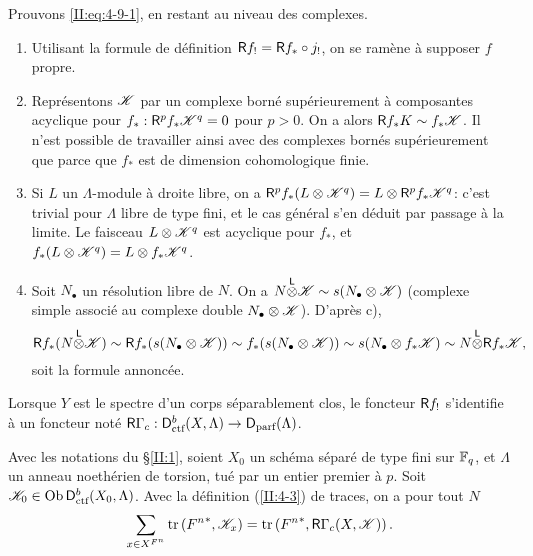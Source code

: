 Prouvons \eqref{II:eq:4-9-1}, en restant au niveau des complexes. 
\begin{enumerate}[\indent a)]
  \item Utilisant la formule de d\'efinition $\mathsf{R} f_! = \mathsf{R} f_*\circ j_!$, on se 
    ram\`ene \`a supposer $f$ propre. 
  \item Repr\'esentons $\mathscr{K}$ par un complexe born\'e 
    sup\'erieurement \`a composantes acyclique pour $f_*:\mathsf{R}^p f_* \mathscr{K}^q = 0$ 
    pour $p>0$. On a alors $\mathsf{R} f_* K \sim f_* \mathscr{K}$. Il n'est possible de 
    travailler ainsi avec des complexes born\'es sup\'erieurement que parce que 
    $f_*$ est de dimension cohomologique finie. 
  \item Si $L$ un $\Lambda$-module \`a droite libre, on a 
    $\mathsf{R}^p f_*(L\otimes \mathscr{K}^q) = L\otimes \mathsf{R}^p f_* \mathscr{K}^q$: c'est trivial pour 
    $\Lambda$ libre de type fini, et le cas g\'en\'eral s'en d\'eduit par 
    passage \`a la limite. Le faisceau $L\otimes \mathscr{K}^q$ est acyclique pour 
    $f_*$, et $f_*(L\otimes \mathscr{K}^q) = L\otimes f_* \mathscr{K}^q$. 
  \item Soit $N_\bullet$ un r\'esolution libre de $N$. On a 
    $N{\overset{\mathsf{L}}{\otimes}} \mathscr{K}\sim s(N_\bullet\otimes \mathscr{K})$ (complexe simple associ\'e au 
    complexe double $N_\bullet\otimes \mathscr{K}$). D'apr\`es c), 
    \[
      \mathsf{R} f_*(N{\overset{\mathsf{L}}{\otimes}} \mathscr{K}) \sim \mathsf{R} f_* (s(N_\bullet\otimes \mathscr{K})) \sim f_*(s(N_\bullet\otimes \mathscr{K})) \sim s(N_\bullet\otimes f_* \mathscr{K}) \sim N{\overset{\mathsf{L}}{\otimes}} \mathsf{R} f_* \mathscr{K} \text{,}
    \]
    soit la formule annonc\'ee. 
\end{enumerate}

Lorsque $Y$ est le spectre d'un corps s\'eparablement clos, le foncteur $\mathsf{R} f_!$ 
s'identifie \`a un foncteur not\'e 
$\mathsf{R} \Gamma_c : \mathsf{D}_\text{ctf}^b(X,\Lambda)\to\mathsf{D}_\text{parf}(\Lambda)$. 





\begin{theorem_}\label{II:4-10}
Avec les notations du \S\ref{II:1}, soient $X_0$ un sch\'ema s\'epar\'e de type 
fini sur $\mathbb{F}_q$, et $\Lambda$ un anneau noeth\'erien de torsion, tu\'e par un 
entier premier \`a $p$. Soit $\mathscr{K}_0\in\operatorname{Ob}\mathsf{D}_\textnormal{ctf}^b(X_0,\Lambda)$. 
Avec la d\'efinition (\ref{II:4-3}) de traces, on a pour tout $N$ 
\begin{equation}\label{II:eq:4-10}
  \sum_{x\in X^{F^n}} \operatorname{tr}\left({F^n}^*,\mathscr{K}_x\right) = \operatorname{tr}\left({F^n}^*,\mathsf{R}\Gamma_c(X,\mathscr{K})\right) \text{.}
\end{equation}
\end{theorem_}

